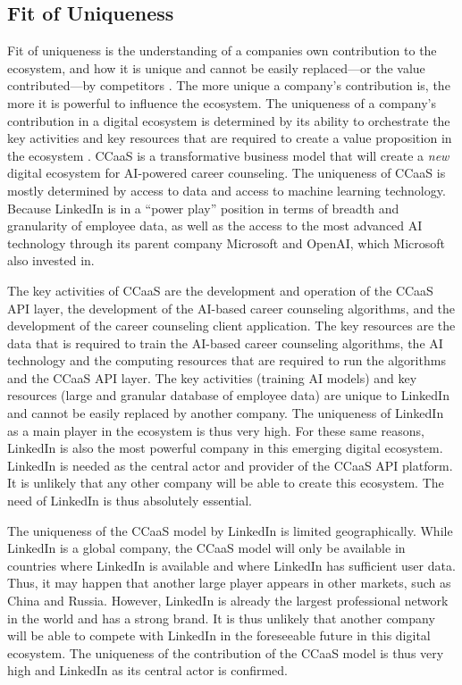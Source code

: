 \subsection{Fit of Uniqueness}

Fit of uniqueness is the understanding of a companies own contribution to the ecosystem, and how it is unique
and cannot be easily replaced---or the value contributed---by competitors \citep[p.~53]{griederDigitalEcosystemHow2019}.
The more unique a company's contribution is, the more it is powerful to influence the ecosystem. The uniqueness of a company's
contribution in a digital ecosystem is determined by its ability to orchestrate the key activities and key resources 
that are required to create a value proposition in the ecosystem \citep[p.~201]{schwafertsLectureStrategicBusiness2023}.
CCaaS is a transformative business model that will create a \textit{new} digital ecosystem for
AI-powered career counseling. The uniqueness of CCaaS is mostly determined by access to data and 
access to machine learning technology. Because LinkedIn is in a ``power play'' position in terms 
of breadth and granularity of employee data, as well as the access to the most advanced AI technology 
through its parent company Microsoft and OpenAI, which Microsoft also invested in.

The key activities of CCaaS are the development and operation of the CCaaS API layer, the development
of the AI-based career counseling algorithms, and the development of the career counseling client
application. The key resources are the data that is required to train the AI-based career counseling
algorithms, the AI technology and the computing resources that are required to run the algorithms and
the CCaaS API layer. The key activities (training AI models) and key resources (large and granular 
database of employee data) are unique to LinkedIn and cannot be easily replaced by another company.
The uniqueness of LinkedIn as a main player in the ecosystem is thus very high.
For these same reasons, LinkedIn is also the most powerful company in this emerging digital ecosystem.
LinkedIn is needed as the central actor and provider of the CCaaS API platform. It is unlikely that any
other company will be able to create this ecosystem. The need of LinkedIn is thus absolutely essential.

The uniqueness of the CCaaS model by LinkedIn is limited geographically. While LinkedIn is a global
company, the CCaaS model will only be available in countries where LinkedIn is available and where 
LinkedIn has sufficient user data. Thus, it may happen that another large player appears in other 
markets, such as China and Russia. However, LinkedIn is already the largest professional network in
the world and has a strong brand. It is thus unlikely that another company will be able to compete
with LinkedIn in the foreseeable future in this digital ecosystem. The uniqueness of the contribution 
of the CCaaS model is thus very high and LinkedIn as its central actor is confirmed.

